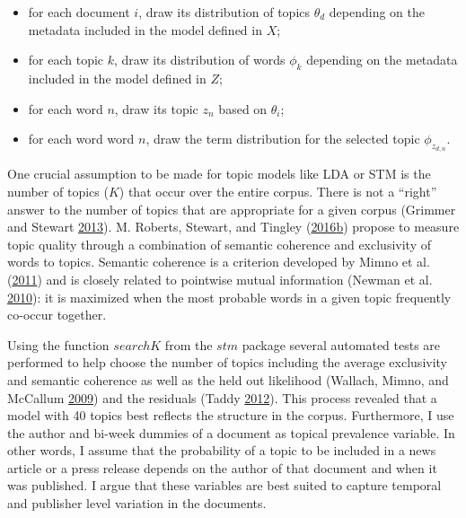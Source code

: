\documentclass[
]{article}
\providecommand{\tightlist}{%
  \setlength{\itemsep}{0pt}\setlength{\parskip}{0pt}}
\begin{document}
\begin{itemize}
\tightlist
\item
  for each document \(i\), draw its distribution of topics \(\theta_d\)
  depending on the metadata included in the model defined in \(X\);
\item
  for each topic \(k\), draw its distribution of words \(\phi_k\)
  depending on the metadata included in the model defined in \(Z\);
\item
  for each word \(n\), draw its topic \(z_n\) based on \(\theta_i\);
\item
  for each word word \(n\), draw the term distribution for the selected
  topic \(\phi_{z_{d,n}}\).
\end{itemize}

One crucial assumption to be made for topic models like LDA or STM is
the number of topics (\(K\)) that occur over the entire corpus. There is
not a ``right'' answer to the number of topics that are appropriate for
a given corpus (Grimmer and Stewart
\protect\hyperlink{ref-grimmer_text_2013}{2013}). M. Roberts, Stewart,
and Tingley
(\protect\hyperlink{ref-roberts_stm:_2016}{2016}\protect\hyperlink{ref-roberts_stm:_2016}{b})
propose to measure topic quality through a combination of semantic
coherence and exclusivity of words to topics. Semantic coherence is a
criterion developed by Mimno et al.
(\protect\hyperlink{ref-mimno_optimizing_2011}{2011}) and is closely
related to pointwise mutual information (Newman et al.
\protect\hyperlink{ref-newman_automatic_2010}{2010}): it is maximized
when the most probable words in a given topic frequently co-occur
together.

Using the function \(searchK\) from the \(stm\) package several
automated tests are performed to help choose the number of topics
including the average exclusivity and semantic coherence as well as the
held out likelihood (Wallach, Mimno, and McCallum
\protect\hyperlink{ref-wallach_rethinking_2009}{2009}) and the residuals
(Taddy \protect\hyperlink{ref-taddy_estimation_2012}{2012}). This
process revealed that a model with 40 topics best reflects the structure
in the corpus. Furthermore, I use the author and bi-week dummies of a
document as topical prevalence variable. In other words, I assume that
the probability of a topic to be included in a news article or a press
release depends on the author of that document and when it was
published. I argue that these variables are best suited to capture
temporal and publisher level variation in the documents.
\end{document}
